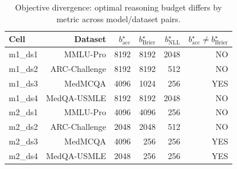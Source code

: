 \begin{table}[ht]
\centering
\small
\begin{tabular}{lrrrrr}
\toprule
Cell & Dataset & $b^\star_{\text{acc}}$ & $b^\star_{\text{Brier}}$ & $b^\star_{\text{NLL}}$ & $b^\star_{\text{acc}}\neq b^\star_{\text{Brier}}$ \\
\midrule
m1\_ds1 & MMLU-Pro & 8192 & 8192 & 2048 & NO \\
m1\_ds2 & ARC-Challenge & 8192 & 8192 & 512 & NO \\
m1\_ds3 & MedMCQA & 4096 & 1024 & 256 & YES \\
m1\_ds4 & MedQA-USMLE & 8192 & 8192 & 2048 & NO \\
m2\_ds1 & MMLU-Pro & 4096 & 4096 & 256 & NO \\
m2\_ds2 & ARC-Challenge & 2048 & 2048 & 512 & NO \\
m2\_ds3 & MedMCQA & 4096 & 256 & 256 & YES \\
m2\_ds4 & MedQA-USMLE & 2048 & 256 & 256 & YES \\
\bottomrule
\end{tabular}
\caption{Objective divergence: optimal reasoning budget differs by metric across model/dataset pairs.}
\label{tab:a05_objective}
\end{table}